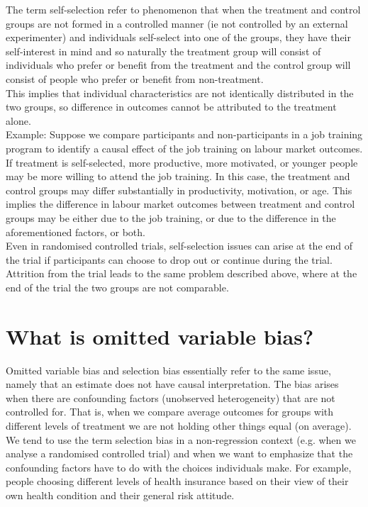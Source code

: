 \documentclass[%
 aip,
 jmp,%
 amsmath,amssymb,
 reprint,%
]{revtex4-1}
\begin{document}
The term self-selection refer to phenomenon that when the treatment and control
groups are not formed in a controlled manner (ie not controlled by an external experimenter)
and individuals self-select into one of the groups, they have their self-interest
in mind and so naturally the treatment group will consist of individuals who prefer or
benefit from the treatment and the control group will consist of people who prefer or
benefit from non-treatment.\\

This implies that individual characteristics are not identically distributed in the two groups,
so difference in outcomes cannot be attributed to the treatment alone.\\

Example: Suppose we compare participants and non-participants in a job training program
to identify a causal effect of the job training on labour market outcomes. If treatment is
self-selected, more productive, more motivated, or younger people may be more willing
to attend the job training. In this case, the treatment and control groups may differ
substantially in productivity, motivation, or age. This implies the difference in labour
market outcomes between treatment and control groups may be either due to the job
training, or due to the difference in the aforementioned factors, or both.\\

Even in randomised controlled trials, self-selection issues can arise at the end of the trial
if participants can choose to drop out or continue during the trial. Attrition from the
trial leads to the same problem described above, where at the end of the trial the two
groups are not comparable.\\

\section*{What is omitted variable bias?}

Omitted variable bias and selection bias essentially refer to the same
issue, namely that an estimate does not have causal interpretation. The bias arises when there
are confounding factors (unobserved heterogeneity) that are not controlled for. That is, when
we compare average outcomes for groups with different levels of treatment we are not holding
other things equal (on average).\\

We tend to use the term selection bias in a non-regression context (e.g. when we analyse a
randomised controlled trial) and when we want to emphasize that the confounding factors have
to do with the choices individuals make. For example, people choosing different levels of health
insurance based on their view of their own health condition and their general risk attitude.\\
\end{document}
